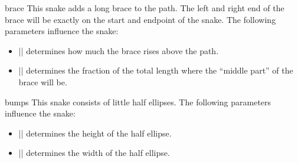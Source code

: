 \begin{snake}{brace}
  This snake adds a long brace to the path. The left and right end of
  the brace will be exactly on the start and endpoint of the
  snake. The following parameters influence the snake:  
  \begin{itemize}
  \item |\pgfsnakesegmentamplitude|
    determines how much the brace rises above the path.
  \item |\pgfsnakesegmentaspect|
    determines the fraction of the total length where the ``middle
    part'' of the brace will be.  
  \end{itemize}
\begin{codeexample}[]
\end{codeexample}
\end{snake}

\begin{snake}{bumps}
  This snake consists of little half ellipses. The following parameters
  influence the snake:
  \begin{itemize}
  \item |\pgfsnakesegmentamplitude|
    determines the height of the half ellipse.
  \item |\pgfsnakesegmentlength|
    determines the width of the half ellipse.
  \end{itemize}
\begin{codeexample}[]
\end{codeexample}
\end{snake}


